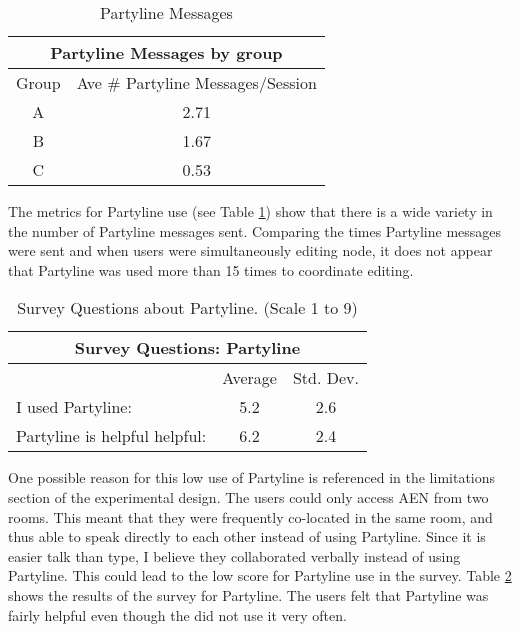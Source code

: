 \small
\begin{table}[htb]
  \caption{Partyline Messages}
  \begin{center}
    \begin{tabular}{|c|c|}
      \hline
      \multicolumn{2}{|c|}{\rule[-3mm]{0mm}{8mm}\bf Partyline Messages by group}\\ 
      \hline
      Group&Ave \# Partyline Messages/Session\\ \hline
      \hline
      A&2.71\\ \hline
      B&1.67\\ \hline
      C&0.53\\ \hline
    \end{tabular}
  \end{center}
  \label{tab:Partyline}
\end{table}
\normalsize


The metrics for Partyline use (see Table \ref{tab:Partyline}) show that
there is a wide variety in the number of Partyline messages sent.
Comparing the times Partyline messages were sent and when users were
simultaneously editing node, it does not appear that Partyline was used
more than 15 times to coordinate editing.

\small
\begin{table}
  \caption{Survey Questions about Partyline. (Scale 1 to 9)}
  \begin{center}
    \begin{tabular}{|l|c|c|}
      \hline
      \multicolumn{3}{|c|}{\rule[-3mm]{0mm}{8mm}\bf Survey Questions:
      Partyline}\\ \hline
      &Average&Std. Dev.\\ \hline
      I used Partyline:&5.2&2.6\\\hline
      Partyline is helpful helpful:&6.2&2.4\\\hline
    \end{tabular}
  \end{center}
  \label{tab:survey-Partyline}
\end{table}
\normalsize

One possible reason for this low use of Partyline is referenced in the
limitations section of the experimental design.  The users could only
access AEN from two rooms.  This meant that they were frequently co-located
in the same room, and thus able to speak directly to each other instead of
using Partyline.  Since it is easier talk than type, I believe they
collaborated verbally instead of using Partyline.  This could lead to the
low score for Partyline use in the survey.  Table
\ref{tab:survey-Partyline} shows the results of the survey for Partyline.
The users felt that Partyline was fairly helpful even though the did not
use it very often.


